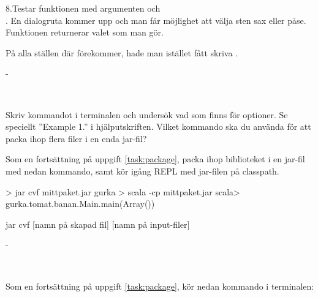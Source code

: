 8.Testar funktionen med argumenten  och \\ . En dialogruta kommer upp och man får möjlighet att välja sten sax eller påse. Funktionen returnerar valet som man gör.

\SubtaskSolved  På alla ställen där  förekommer, hade man istället fått skriva .

\SubtaskSolved  -



\QUESTEND









\QUESTBEGIN

\Task  \what~ 

\Subtask Skriv kommandot  i terminalen och undersök vad som finns för optioner. Se speciellt ''Example 1.'' i hjälputskriften. Vilket kommando ska du använda för att packa ihop flera filer i en enda jar-fil?

\Subtask Som en fortsättning på uppgift \ref{task:package}, packa ihop biblioteket  i en jar-fil med nedan kommando, samt kör igång REPL med jar-filen på classpath.

\begin{REPL}
> jar cvf mittpaket.jar gurka
> scala -cp mittpaket.jar
scala> gurka.tomat.banan.Main.main(Array())
\end{REPL}


\SOLUTION


\TaskSolved \what
 

\SubtaskSolved  jar cvf [namn på skapad fil] [namn på input-filer]

\SubtaskSolved  -



\QUESTEND









\QUESTBEGIN

\Task  \what~ 

\Subtask Som en fortsättning på uppgift \ref{task:package}, kör nedan kommando i terminalen:

